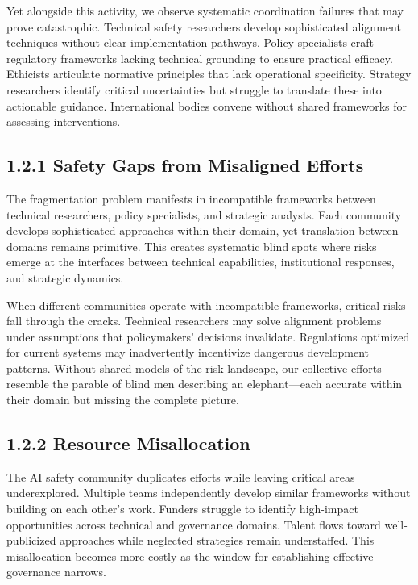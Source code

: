 \documentclass[
  11pt,
  letterpaper,
]{book}
\begin{document}
\textcite{tegmark2024}

\textcite{european2024}

Yet alongside this activity, we observe systematic coordination failures
that may prove catastrophic. Technical safety researchers develop
sophisticated alignment techniques without clear implementation
pathways. Policy specialists craft regulatory frameworks lacking
technical grounding to ensure practical efficacy. Ethicists articulate
normative principles that lack operational specificity. Strategy
researchers identify critical uncertainties but struggle to translate
these into actionable guidance. International bodies convene without
shared frameworks for assessing interventions.

\subsection*{1.2.1 Safety Gaps from Misaligned
Efforts}\label{sec-safety-gaps}

The fragmentation problem manifests in incompatible frameworks between
technical researchers, policy specialists, and strategic analysts. Each
community develops sophisticated approaches within their domain, yet
translation between domains remains primitive. This creates systematic
blind spots where risks emerge at the interfaces between technical
capabilities, institutional responses, and strategic dynamics.

When different communities operate with incompatible frameworks,
critical risks fall through the cracks. Technical researchers may solve
alignment problems under assumptions that policymakers' decisions
invalidate. Regulations optimized for current systems may inadvertently
incentivize dangerous development patterns. Without shared models of the
risk landscape, our collective efforts resemble the parable of blind men
describing an elephant---each accurate within their domain but missing
the complete picture.

\textcite{paul2023}

\subsection*{1.2.2 Resource
Misallocation}\label{sec-resource-misallocation}

The AI safety community duplicates efforts while leaving critical areas
underexplored. Multiple teams independently develop similar frameworks
without building on each other's work. Funders struggle to identify
high-impact opportunities across technical and governance domains.
Talent flows toward well-publicized approaches while neglected
strategies remain understaffed. This misallocation becomes more costly
as the window for establishing effective governance narrows.
\end{document}
